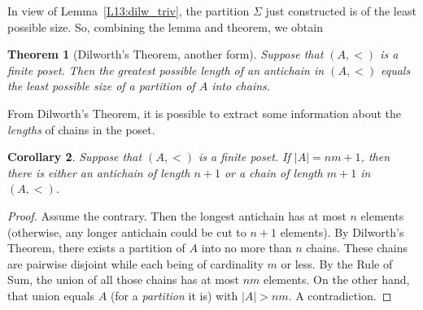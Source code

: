 \documentclass[12pt,notitlepage]{article}
\theoremstyle{plain}
\newtheorem{thm}{Theorem}[section]
\newtheorem{corr}[thm]{Corollary}
\theoremstyle{definition}
\theoremstyle{plain}
\newcommand{\1}{\mathbf{1}}
\newcommand{\0}{\mathbf{0}}
\begin{document}
In view of Lemma~\ref{L13:dilw_triv}, the partition $\Sigma$ just constructed is of the least possible size. So, combining the lemma and theorem, we obtain
\begin{thm}[Dilworth's Theorem, another form]
Suppose that $(A, <)$ is a finite poset. Then the greatest possible length of an antichain in $(A, <)$ equals the least possible size of a partition of $A$ into chains.
\end{thm}

From Dilworth's Theorem, it is possible to extract some information about the \emph{lengths} of chains in the poset.
\begin{corr}\label{chain_size}
Suppose that $(A, <)$ is a finite poset. If $|A| = n m + 1$, then there is either an antichain of length $n + 1$ or a chain of length $m + 1$ in $(A, <)$.
\end{corr}
\begin{proof}
Assume the contrary. Then the longest antichain has at most $n$ elements (otherwise, any longer antichain could be cut to $n + 1$ elements). By Dilworth's Theorem, there exists a partition of $A$ into no more than $n$ chains. These chains are pairwise disjoint while each being of cardinality $m$ or less. By the Rule of Sum, the union of all those chains has at most $n m$ elements. On the other hand, that union equals $A$ (for a \emph{partition} it is) with $|A| > n m$. A contradiction.
\end{proof}
\end{document}
